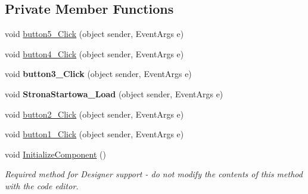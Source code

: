 \subsection*{Private Member Functions}
\begin{DoxyCompactItemize}
\item 
void \mbox{\hyperlink{class_quiz___matematyczny_1_1_strona_startowa_abf42997537b7b3bedfa805c214788a6d}{button5\+\_\+\+Click}} (object sender, Event\+Args e)
\item 
void \mbox{\hyperlink{class_quiz___matematyczny_1_1_strona_startowa_ae8e15d6e8c118b59a8761b0dc6693387}{button4\+\_\+\+Click}} (object sender, Event\+Args e)
\item 
\mbox{\label{class_quiz___matematyczny_1_1_strona_startowa_a72ca3ce3bf696350ceb56a339d6ef100}} 
void {\bfseries button3\+\_\+\+Click} (object sender, Event\+Args e)
\item 
\mbox{\label{class_quiz___matematyczny_1_1_strona_startowa_a2e3efabace382d4af7df0a483939779c}} 
void {\bfseries Strona\+Startowa\+\_\+\+Load} (object sender, Event\+Args e)
\item 
void \mbox{\hyperlink{class_quiz___matematyczny_1_1_strona_startowa_a073b628d96d8ccaabc8ad1eb9ee7cbe5}{button2\+\_\+\+Click}} (object sender, Event\+Args e)
\item 
void \mbox{\hyperlink{class_quiz___matematyczny_1_1_strona_startowa_a7cdd300e897bcd380753f964fc89a58c}{button1\+\_\+\+Click}} (object sender, Event\+Args e)
\item 
void \mbox{\hyperlink{class_quiz___matematyczny_1_1_strona_startowa_ab0279222230ec5cc60e0ee3026204921}{Initialize\+Component}} ()
\begin{DoxyCompactList}\small\item\em Required method for Designer support -\/ do not modify the contents of this method with the code editor. \end{DoxyCompactList}\end{DoxyCompactItemize}
